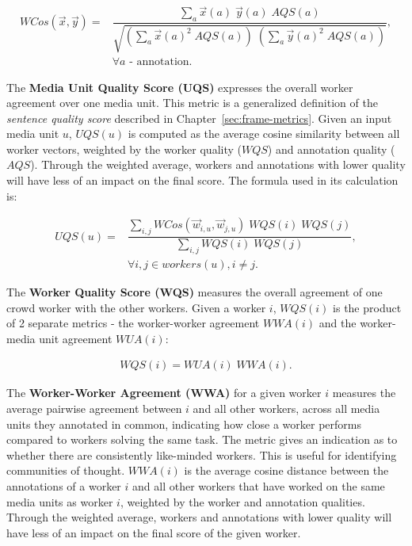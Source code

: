 \begin{align}
WCos(\vec{x}, \vec{y}) = & \dfrac{\sum\limits_{a} \vec{x} (a) \; \vec{y} (a) \;  AQS(a)}{\sqrt{(\sum\limits_{a} \vec{x}(a)^2 \; AQS(a)) \; (\sum\limits_{a} \vec{y}(a)^2 \; AQS(a))}}, \\
& \forall a \text{ - annotation}. \nonumber
\end{align}

The \textbf{Media Unit Quality Score (UQS)} expresses the overall worker agreement over one media unit. This metric is a generalized definition of the \textit{sentence quality score} described in Chapter~\ref{sec:frame-metrics}. Given an input media unit $u$, $UQS(u)$ is computed as the average cosine similarity between all worker vectors, weighted by the worker quality ($WQS$) and annotation quality ($AQS$). Through the weighted average, workers and annotations with lower quality will have less of an impact on the final score. The formula used in its calculation is:

\begin{align}
UQS(u) = & \dfrac{\sum\limits_{i, j} WCos(\vec{w}_{i,u} , \vec{w}_{j,u}) \; WQS(i) \; WQS(j)}{\sum\limits_{i,j} WQS(i) \; WQS(j)}, \\
& \forall i, j \in workers(u), i \neq j. \nonumber
\end{align}

The \textbf{Worker Quality Score (WQS)} measures the overall agreement of one crowd worker with the other workers. Given a worker $i$, $WQS(i)$ is the product of 2 separate metrics - the worker-worker agreement $WWA(i)$ and the worker-media unit agreement $WUA(i)$:

\begin{align}
WQS(i) = WUA(i) \; WWA(i) .
\end{align}

The \textbf{Worker-Worker Agreement (WWA)} for a given worker $i$ measures the average pairwise agreement between $i$ and all other workers, across all media units they annotated in common, indicating how close a worker performs compared to workers solving the same task.  The metric gives an indication as to whether there are consistently like-minded workers. This is useful for identifying communities of thought. $WWA(i)$ is the average cosine distance between the annotations of a worker $i$ and all other workers that have worked on the same media units as worker $i$, weighted by the worker and annotation qualities. Through the weighted average, workers and annotations with lower quality will have less of an impact on the final score of the given worker.

